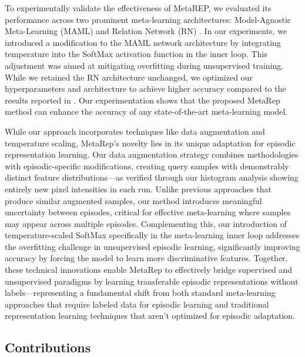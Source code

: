 To experimentally validate the effectiveness of MetaREP, we evaluated its performance across two prominent meta-learning architectures: Model-Agnostic Meta-Learning (MAML) \cite{finn2017model} and Relation Network (RN) \cite{sung2018learning}. In our experiments, we introduced a modification to the MAML network architecture by integrating temperature \cite{sohn2016improved} into the SoftMax activation function in the inner loop. This adjustment was aimed at mitigating overfitting during unsupervised training. While we retained the RN architecture unchanged, we optimized our hyperparameters and architecture to achieve higher accuracy compared to the results reported in \cite{sung2018learning}. Our experimentation shows that the proposed MetaRep method can enhance the accuracy of any state-of-the-art meta-learning model.

While our approach incorporates techniques like data augmentation and temperature scaling, MetaRep's novelty lies in its unique adaptation for episodic representation learning. Our data augmentation strategy combines methodologies with episodic-specific modifications, creating query samples with demonstrably distinct feature distributions—as verified through our histogram analysis showing entirely new pixel intensities in each run. Unlike previous approaches that produce similar augmented samples, our method introduces meaningful uncertainty between episodes, critical for effective meta-learning where samples may appear across multiple episodes. Complementing this, our introduction of temperature-scaled SoftMax specifically in the meta-learning inner loop addresses the overfitting challenge in unsupervised episodic learning, significantly improving accuracy by forcing the model to learn more discriminative features. Together, these technical innovations enable MetaRep to effectively bridge supervised and unsupervised paradigms by learning transferable episodic representations without labels—representing a fundamental shift from both standard meta-learning approaches that require labeled data for episodic learning and traditional representation learning techniques that aren't optimized for episodic adaptation.

\subsection{Contributions}

